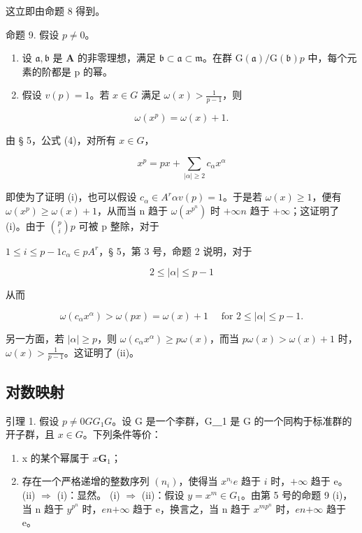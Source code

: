 这立即由命题 8 得到。

命题 9. 假设 \(p \neq 0\)。

\begin{enumerate}
\def\labelenumi{(\roman{enumi})}
\item
  设 \(\mathfrak{a},\mathfrak{b}\) 是 \(\mathbf{A}\) 的非零理想，满足 \(\mathfrak{b} \subset \mathfrak{a} \subset \mathfrak{m}\)。在群 \(\mathrm{G}(\mathfrak{a}) / \mathrm{G}(\mathfrak{b})\)\(p\) 中，每个元素的阶都是 p 的幂。
\item
  假设 \(v(p) = 1\)。若 \(x \in G\) 满足 \(\omega(x) > \frac{1}{p - 1}\)，则
\end{enumerate}

\[
\omega (x ^ {p}) = \omega (x) + 1.
\]

由 § 5，公式 (4)，对所有 \(x \in G\)，

\[
x ^ {p} = p x + \sum_ {| \alpha | \geqslant 2} c _ {\alpha} x ^ {\alpha}
\]

即使为了证明 (i)，也可以假设 \(c_{\alpha} \in A^{r}\)\(\alpha\)\(v(p) = 1\)。于是若 \(\omega(x) \geqslant 1\)，便有 \(\omega(x^{p}) \geqslant \omega(x) + 1\)，从而当 n 趋于 \(\omega(x^{p^{n}})\) 时 \(+\infty\)\(n\) 趋于 \(+\infty\)；这证明了 (i)。由于 \(\binom{p}{i}\)\(p\) 可被 p 整除，对于

\(1 \leqslant i \leqslant p - 1\)\(c_{\alpha} \in pA^{r}\)，§ 5，第 3 号，命题 2 说明，对于

\[
2 \leqslant | \alpha | \leqslant p - 1
\]

从而

\[
\omega \left(c _ {\alpha} x ^ {\alpha}\right) > \omega (p x) = \omega (x) + 1 \quad \text { for } 2 \leqslant | \alpha | \leqslant p - 1.
\]

另一方面，若 \(|\alpha| \geqslant p\)，则 \(\omega(c_{\alpha}x^{\alpha}) \geqslant p\omega(x)\)，而当 \(p\omega(x) > \omega(x) + 1\) 时，\(\omega(x) > \frac{1}{p - 1}\)。这证明了 (ii)。

\subsection{对数映射}

引理 1. 假设 \(p \neq 0\)\(G\)\(G_1\)\(G\)。设 G 是一个李群，G＿1 是 G 的一个同构于标准群的开子群，且 \(x \in G\)。下列条件等价：

\begin{enumerate}
\def\labelenumi{(\roman{enumi})}
\item
  x 的某个幂属于 \(x\)\(\mathbf{G}_1\)；
\item
  存在一个严格递增的整数序列 \((n_{i})\)，使得当 \(x^{n_{i}}\)\(e\) 趋于 \(i\) 时，\(+\infty\) 趋于 e。
  (ii) \(\Rightarrow\) (i)：显然。
  (i) \(\Rightarrow\) (ii)：假设 \(y = x^{m} \in G_{1}\)。由第 5 号的命题 9 (i)，当 n 趋于 \(y^{p^n}\) 时，\(e\)\(n\)\(+\infty\) 趋于 e，换言之，当 n 趋于 \(x^{mp^n}\) 时，\(e\)\(n\)\(+\infty\) 趋于 e。
\end{enumerate}

